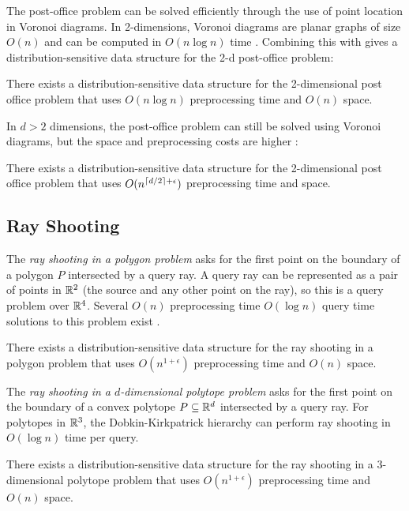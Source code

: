\documentclass{patmorin}
\begin{document}
The post-office problem can be solved efficiently through the use of
point location in Voronoi diagrams.  In 2-dimensions, Voronoi diagrams
are planar graphs of size $O(n)$ and can be computed in $O(n\log n)$ time
\cite{ps85}.  Combining this with  gives
a distribution-sensitive data structure for the 2-d post-office problem:

\begin{thm}
  There exists a distribution-sensitive data structure for the
  2-dimensional post office problem that uses $O(n\log n)$ preprocessing
  time and $O(n)$ space.
\end{thm}

In $d >2$ dimensions, the post-office problem can still be solved using
Voronoi diagrams, but the space and preprocessing costs are higher
\cite{c88postoffice}:

\begin{thm}
  There exists a distribution-sensitive data structure for the
  2-dimensional post office problem that uses $O(n^{{\lceil d/2 \rceil}+\epsilon})$
  preprocessing time and space.
\end{thm}

\subsection{Ray Shooting}

The \emph{ray shooting in a polygon problem} asks for the first point
on the boundary of a polygon $P$ intersected by a query ray.  A query
ray can be represented as a pair of points in $\mathbb{R}^2$ (the source and
any other point on the ray), so this is a query problem over $\mathbb{R}^4$.
Several $O(n)$ preprocessing time $O(\log n)$ query time solutions to
this problem exist \cite{cegghss94,hs95}.

\begin{thm}
  There exists a distribution-sensitive data structure for the ray shooting
  in a polygon problem that uses $O(n^{1+\epsilon})$ preprocessing time and
  $O(n)$ space.
\end{thm}

The \emph{ray shooting in a $d$-dimensional polytope problem}
asks for the first point on the boundary of a convex polytope
$P\subseteq\mathbb{R}^d$ intersected by a query ray.  For polytopes in $\mathbb{R}^3$,
the Dobkin-Kirkpatrick hierarchy \cite{dk83} can perform ray shooting
in $O(\log n)$ time per query.

\begin{thm}
  There exists a distribution-sensitive data structure for the
  ray shooting in a $3$-dimensional polytope problem that uses
  $O(n^{1+\epsilon})$ preprocessing time and $O(n)$ space.
\end{thm}
\end{document}
